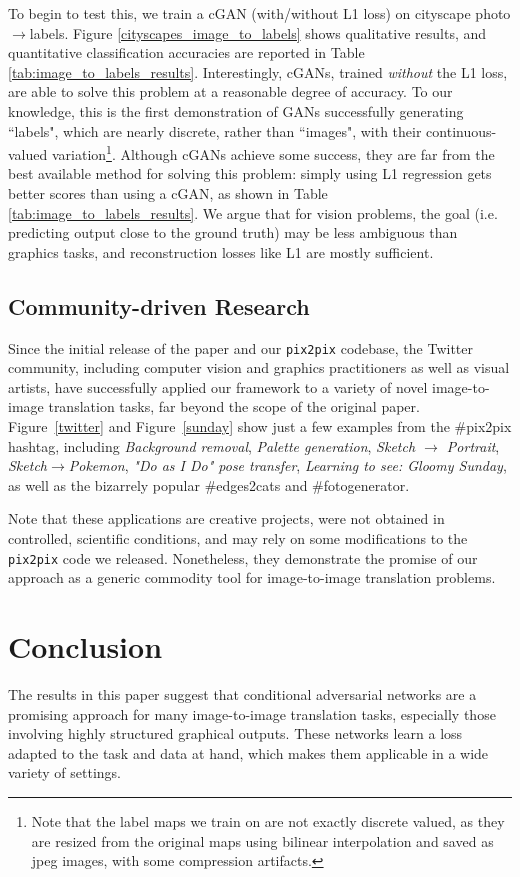 To begin to test this, we train a cGAN (with/without L1 loss) on cityscape photo$\rightarrow$labels. Figure \ref{cityscapes_image_to_labels} shows qualitative results, and quantitative classification accuracies are reported in Table \ref{tab:image_to_labels_results}. Interestingly, cGANs, trained \emph{without} the L1 loss, are able to solve this problem at a reasonable degree of accuracy. To our knowledge, this is the first demonstration of GANs successfully generating ``labels", which are nearly discrete, rather than ``images", with their continuous-valued variation\footnote{Note that the label maps we train on are not exactly discrete valued, as they are resized from the original maps using bilinear interpolation and saved as jpeg images, with some compression artifacts.}. Although cGANs achieve some success, they are far from the best available method for solving this problem: simply using L1 regression gets better scores than using a cGAN, as shown in Table \ref{tab:image_to_labels_results}. We argue that for vision problems, the goal (i.e. predicting output close to the ground truth) may be less ambiguous than graphics tasks, and reconstruction losses like L1 are mostly sufficient.

\subsection{Community-driven Research}

Since the initial release of the paper and our {\tt pix2pix} codebase, the Twitter community, including computer vision and graphics practitioners as well as visual artists, have successfully applied our framework to a variety of novel image-to-image translation tasks, far beyond the scope of the original paper.  Figure~\ref{twitter} and Figure~\ref{sunday}  show just a few examples from the \#pix2pix hashtag, including \emph{Background removal}, \emph{Palette generation}, \emph{Sketch $\rightarrow$ Portrait}, \emph{Sketch$\rightarrow$Pokemon}, \emph{"Do as I Do" pose transfer}, \emph{Learning to see: Gloomy Sunday}, as well as the bizarrely popular \#edges2cats and \#fotogenerator.

Note that these applications are creative projects, were not obtained in controlled, scientific conditions, and may rely on some modifications to the {\tt pix2pix} code we released. Nonetheless, they demonstrate the promise of our approach as a generic commodity tool for image-to-image translation problems.

\section{Conclusion}
The results in this paper suggest that conditional adversarial networks are a promising approach for many image-to-image translation tasks, especially those involving highly structured graphical outputs. These networks learn a loss adapted to the task and data at hand, which makes them applicable in a wide variety of settings.

